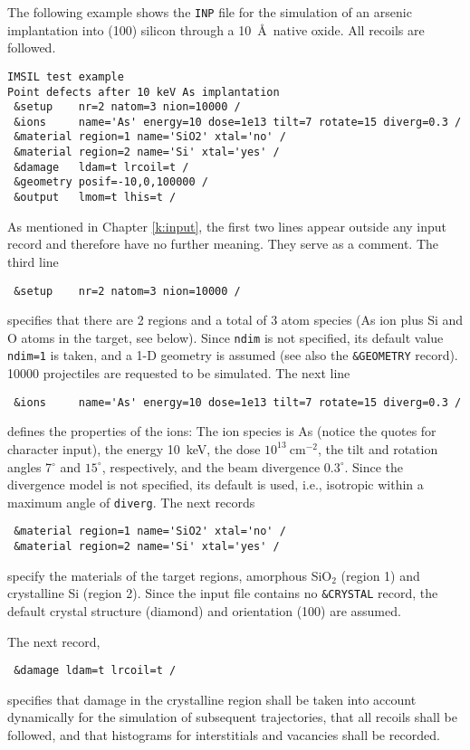 The following example shows the \texttt{INP} file for the simulation of an 
arsenic implantation into (100) silicon through a 10~\AA\ native oxide. 
All recoils are followed.

\begin{verbatim}
IMSIL test example
Point defects after 10 keV As implantation
 &setup    nr=2 natom=3 nion=10000 /
 &ions     name='As' energy=10 dose=1e13 tilt=7 rotate=15 diverg=0.3 /
 &material region=1 name='SiO2' xtal='no' /
 &material region=2 name='Si' xtal='yes' /
 &damage   ldam=t lrcoil=t /
 &geometry posif=-10,0,100000 /
 &output   lmom=t lhis=t /
\end{verbatim}

As mentioned in Chapter \ref{k:input}, the first two lines appear outside any
input record and therefore have no further meaning. They serve as a comment. 
The third line
%
\begin{verbatim}
 &setup    nr=2 natom=3 nion=10000 /
\end{verbatim}
%
specifies that there are 2 regions and a total of 3 atom species (As ion plus 
Si and O atoms in the target, see below). Since \texttt{ndim} is not specified,
its default value \texttt{ndim=1} is taken, and a 1-D geometry is assumed (see
also the \texttt{\&GEOMETRY} record). 
10000 projectiles are requested to be simulated. 
The next line
%
\begin{verbatim}
 &ions     name='As' energy=10 dose=1e13 tilt=7 rotate=15 diverg=0.3 /
\end{verbatim}
%
defines the properties of the ions: 
The ion species is As (notice the quotes for character input), the energy
10~keV, the dose $10^{13}~$cm$^{-2}$, the tilt and rotation angles 7$^\circ$
and $15^\circ$, respectively, and the beam divergence $0.3^\circ$. 
Since the divergence model is not specified, its default is used, i.e.,
isotropic within a maximum angle of \texttt{diverg}. 
The next records
%
\begin{verbatim}
 &material region=1 name='SiO2' xtal='no' /
 &material region=2 name='Si' xtal='yes' /
\end{verbatim}
%
specify the materials of the target regions, amorphous SiO$_2$ (region
1) and crystalline Si (region 2). Since the input file contains no
\texttt{\&CRYSTAL} record, the default crystal structure (diamond) and
orientation (100) are assumed.

The next record,
%
\begin{verbatim}
 &damage ldam=t lrcoil=t /
\end{verbatim}
%
specifies that damage in the crystalline region shall be taken into account
dynamically for the simulation of subsequent trajectories, that all recoils
shall be followed, and that histograms for interstitials and vacancies shall
be recorded.

